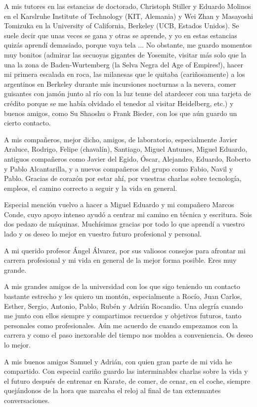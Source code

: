A mis tutores en las estancias de doctorado, Christoph Stiller y Eduardo Molinos en el Karslruhe Institute of Technology (KIT, Alemania) y Wei Zhan y Masayoshi Tomizuka en la University of California, Berkeley (UCB, Estados Unidos). Se suele decir que unas veces se gana y otras se aprende, y yo en estas estancias quizás aprendí demasiado, porque vaya tela ... No obstante, me guardo momentos muy bonitos (admirar las secuoyas gigantes de Yosemite, visitar más solo que la una la zona de Baden-Wurtemberg (la Selva Negra del Age of Empires!), hacer mi primera escalada en roca, las milanesas que le quitaba (cariñosamente) a los argentinos en Berkeley durante mis incursiones nocturnas a la nevera, comer guisantes con jamón junto al río con la luz tenue del atardecer con una tarjeta de crédito porque se me había olvidado el tenedor al visitar Heidelberg, etc.) y buenos amigos, como Su Shaoshu o Frank Bieder, con los que aún guardo un cierto contacto. 

A mis compañeros, mejor dicho, amigos, de laboratorio, especialmente Javier Araluce, Rodrigo, Felipe (chavalín), Santiago, Miguel Antunes, Miguel Eduardo, antiguos compañeros como Javier del Egido, Óscar, Alejandro, Eduardo, Roberto y Pablo Alcantarilla, y a nuevos compañeros del grupo como Fabio, Navil y Pablo. Gracias de corazón por estar ahí, por vuestras charlas sobre tecnología, empleos, el camino correcto a seguir y la vida en general.

Especial mención vuelvo a hacer a Miguel Eduardo y mi compañero Marcos Conde, cuyo apoyo intenso ayudó a centrar mi camino en técnica y escritura. Sois dos pedazo de máquinas. Muchísimas gracias por todo lo que aprendí a vuestro lado y os deseo lo mejor en vuestro futuro profesional y personal.

A mi querido profesor Ángel Álvarez, por sus valiosos consejos para afrontar mi carrera profesional y mi vida en general de la mejor forma posible. Eres muy grande.

A mis grandes amigos de la universidad con los que sigo teniendo un contacto bastante estrecho y les quiero un montón, especialmente a Rocío, Juan Carlos, Esther, Sergio, Antonio, Pablo, Rubén y Adrián Rocandio. Una alegría cuando me junto con ellos siempre y compartimos recuerdos y objetivos futuros, tanto personales como profesionales. Aún me acuerdo de cuando empezamos con la carrera y como el paso inexorable del tiempo nos moldea a conveniencia. Os deseo lo mejor.

A mis buenos amigos Samuel y Adrián, con quien gran parte de mi vida he compartido. Con especial cariño guardo las interminables charlas sobre la vida y el futuro después de entrenar en Karate, de comer, de cenar, en el coche, siempre quejándonos de la hora que marcaba el reloj al final de tan extenuantes conversaciones. 

